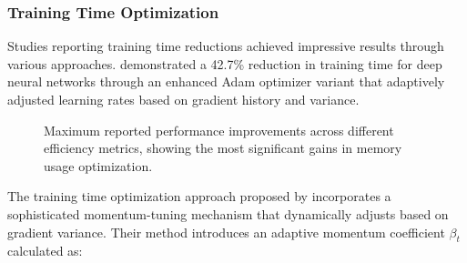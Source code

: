 \documentclass[acmsmall]{acmart}
\begin{document}
\subsubsection{Training Time Optimization}\label{subsubsec:performance-analysis-of-numerical-methods-rq12:training-time-optimization}
Studies reporting training time reductions achieved impressive results through various approaches.\citet{Wang2021} demonstrated a 42.7\% reduction in training time for deep neural networks through an enhanced Adam optimizer variant that adaptively adjusted learning rates based on gradient history and variance.

\begin{figure}[ht]
    \centering
    \caption{Maximum reported performance improvements across different efficiency metrics, showing the most significant gains in memory usage optimization.}
    \label{fig:efficiency_metrics:1}
\end{figure}

The training time optimization approach proposed by \citet{Wang2021} incorporates a sophisticated momentum-tuning mechanism that dynamically adjusts based on gradient variance. Their method introduces an adaptive momentum coefficient $\beta_t$ calculated as:
\end{document}
